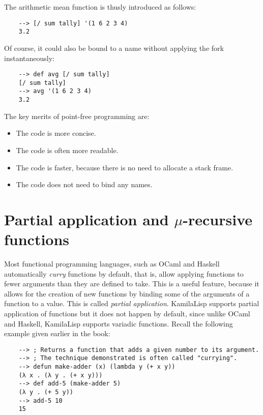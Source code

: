 The arithmetic mean function is thusly introduced as follows:

\begin{Verbatim}
    --> [/ sum tally] '(1 6 2 3 4)
    3.2
\end{Verbatim}

Of course, it could also be bound to a name without applying the fork instantaneously:

\begin{Verbatim}
    --> def avg [/ sum tally]
    [/ sum tally]
    --> avg '(1 6 2 3 4)
    3.2
\end{Verbatim}

The key merits of point-free programming are:

\begin{itemize}
    \item The code is more concise.
    \item The code is often more readable.
    \item The code is faster, because there is no need to allocate a stack frame.
    \item The code does not need to bind any names.
\end{itemize}

\section{Partial application and \texorpdfstring{$\mu$}{mu}-recursive functions}

Most functional programming languages, such as OCaml and Haskell automatically \textit{curry} functions by default, that is, allow applying functions to fewer arguments than they are defined to take. This is a useful feature, because it allows for the creation of new functions by binding some of the arguments of a function to a value. This is called \textit{partial application}. KamilaLisp supports partial application of functions but it does not happen by default, since unlike OCaml and Haskell, KamilaLisp supports variadic functions. Recall the following example given earlier in the book:

\begin{Verbatim}
    --> ; Returns a function that adds a given number to its argument.
    --> ; The technique demonstrated is often called "currying".
    --> defun make-adder (x) (lambda y (+ x y))
    (λ x . (λ y . (+ x y)))
    --> def add-5 (make-adder 5)
    (λ y . (+ 5 y))
    --> add-5 10
    15
\end{Verbatim}

